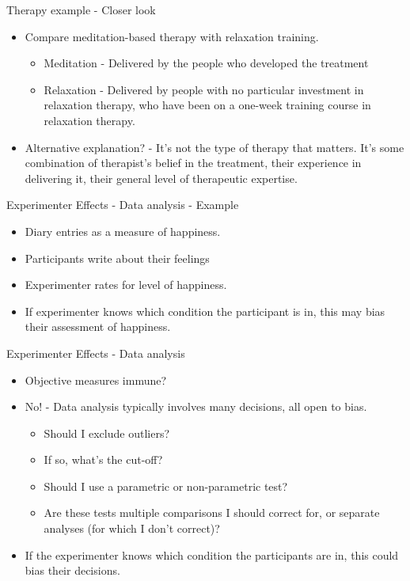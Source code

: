 \documentclass{beamer}
\begin{document}
\begin{frame}{Therapy example - Closer look}
\begin{itemize}
\item Compare meditation-based therapy with relaxation training.
\begin{itemize}
\item Meditation - Delivered by the people who developed the treatment
\item Relaxation - Delivered by people with no particular investment in relaxation therapy, who have been on a one-week training course in relaxation therapy.
\end{itemize}
\item Alternative explanation? - It's not the type of therapy that matters. It's some combination of therapist's belief in the treatment, their experience in delivering it, their general level of therapeutic expertise.
\end{itemize}
\end{frame}

\begin{frame}{Experimenter Effects - Data analysis - Example}
\begin{itemize}
\item Diary entries as a measure of happiness.
\item Participants write about their feelings
\item Experimenter rates for level of happiness.
\item If experimenter knows which condition the participant is in, this may bias their assessment of happiness.

\end{itemize}
\end{frame}

\begin{frame}{Experimenter Effects - Data analysis  }
\begin{itemize}
\item Objective measures immune? 
\item No! - Data analysis typically involves many decisions, all open to bias. 
\begin{itemize}
\item Should I exclude outliers?
\item If so, what's the cut-off?
\item Should I use a parametric or non-parametric test?
\item Are these tests multiple comparisons I should correct for, or separate analyses (for which I don't correct)?
\end{itemize}
\item If the experimenter knows which condition the participants are in, this could bias their decisions.
\end{itemize}
\end{frame}
\end{document}
